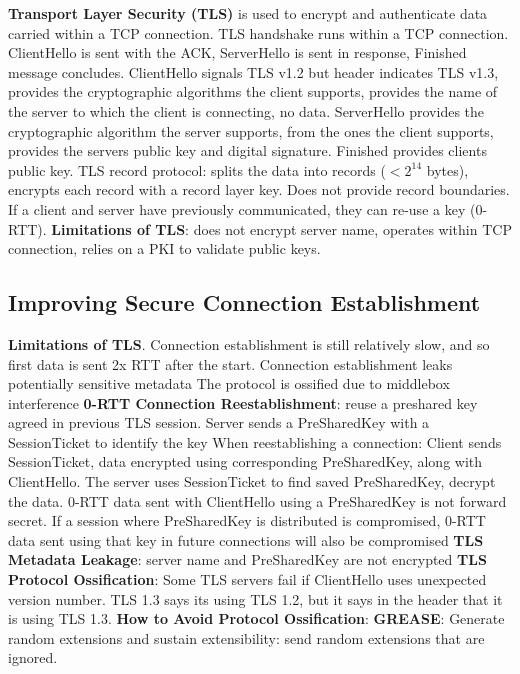 \documentclass{article}
\begin{document}
\textbf{Transport Layer Security (TLS)} is used to encrypt and authenticate data carried within a TCP connection.
TLS handshake runs within a TCP connection. ClientHello is sent with the ACK, ServerHello is sent in response, Finished message concludes.
ClientHello signals TLS v1.2 but header indicates TLS v1.3, provides the cryptographic algorithms the client supports,
provides the name of the server to which the client is connecting, no data.
ServerHello provides the cryptographic algorithm the server supports, from the ones the client supports,
provides the servers public key and digital signature.
Finished provides clients public key.
TLS record protocol: splits the data into records ($< 2^{14}$ bytes), encrypts each record with a record layer key.
Does not provide record boundaries.
If a client and server have previously communicated, they can re-use a key (0-RTT).
\textbf{Limitations of TLS}: does not encrypt server name, operates within TCP connection, relies on a PKI to validate public keys.


\subsection*{Improving Secure Connection Establishment}

\textbf{Limitations of TLS}.
Connection establishment is still relatively slow, and so first data is sent 2x RTT after the start.
Connection establishment leaks potentially sensitive metadata
The protocol is ossified due to middlebox interference
\textbf{0-RTT Connection Reestablishment}: reuse a preshared key agreed in previous TLS session.
Server sends a PreSharedKey with a SessionTicket to identify the key
When reestablishing a connection: Client sends SessionTicket, data encrypted using corresponding
PreSharedKey, along with ClientHello. The server uses SessionTicket to find saved PreSharedKey,
decrypt the data.
0-RTT data sent with ClientHello using a PreSharedKey is not forward secret.
If a session where PreSharedKey is distributed is compromised,
0-RTT data sent using that key in future connections will also be compromised
\textbf{TLS Metadata Leakage}: server name and PreSharedKey are not encrypted
\textbf{TLS Protocol Ossification}: Some TLS servers fail if ClientHello uses unexpected version number.
TLS 1.3 says its using TLS 1.2, but it says in the header that it is using TLS 1.3.
\textbf{How to Avoid Protocol Ossification}:
\textbf{GREASE}: Generate random extensions and sustain extensibility: send random extensions that are ignored.
\end{document}
